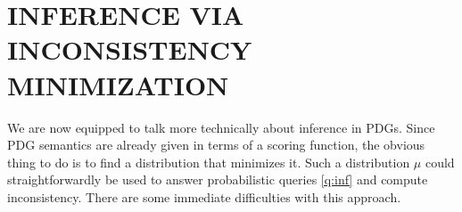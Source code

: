 \documentclass[twoside]{article}
\begin{document}
\section{INFERENCE VIA INCONSISTENCY MINIMIZATION}
    \label{sec:inf-via-inc}

We are now equipped to talk more technically about inference in PDGs.
Since PDG semantics are already given in terms of a scoring function,
the obvious thing to do is to find a distribution that minimizes it.
Such a distribution $\mu$ could straightforwardly be used to answer probabilistic queries \eqref{q:inf} and compute inconsistency.
There are some immediate difficulties with this approach.
\end{document}

